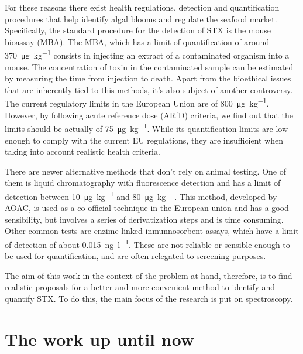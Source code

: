 For these reasons there exist health regulations, detection and quantification procedures that help identify algal blooms and regulate the seafood market.
Specifically, the standard procedure for the detection of STX is the mouse bioassay (MBA).
The MBA, which has a limit of quantification of around \SI{370}{\micro\gram\per\kilo\gram} consists in injecting an extract of a contaminated organism into a mouse.
The concentration of toxin in the contaminated sample can be estimated by measuring the time from injection to death.\cite{who84}
Apart from the bioethical issues that are inherently tied to this methods, it's also subject of another controversy.
The current regulatory limits in the European Union are of \SI{800}{\micro\gram\per\kilo\gram}.
However, by following acute reference dose (ARfD) criteria, we find out that the limits should be actually of \SI{75}{\micro\gram\per\kilo\gram}.\cite{efsa09}
While its quantification limits are low enough to comply with the current EU regulations, they are insufficient when taking into account realistic health criteria.

There are newer alternative methods that don't rely on animal testing.
One of them is liquid chromatography with fluorescence detection and has a limit of detection between \SI{10}{\micro\gram\per\kilo\gram} and \SI{80}{\micro\gram\per\kilo\gram}.\cite{eu17,aoac16}
This method, developed by AOAC, is used as a co-official technique in the European union and has a good sensibility, but involves a series of derivatization steps and is time consuming.
Other common tests are enzime-linked inmunnosorbent assays, which have a limit of detection of about \SI{0.015}{\nano\gram\per\litre}.\cite{wharton17}
These are not reliable or sensible enough to be used for quantification, and are often relegated to screening purposes.

The aim of this work in the context of the problem at hand, therefore, is to find realistic proposals for a better and more convenient method to identify and quantify STX.
To do this, the main focus of the research is put on spectroscopy.

\section{The work up until now}

